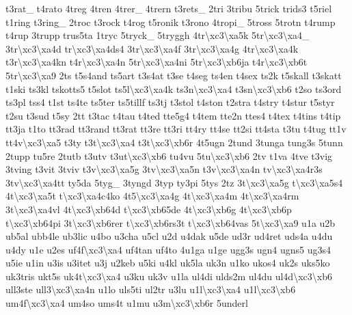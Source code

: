 \begin{DoxyCompactItemize}
t3rat\-\_\- t4rato 4treg 4tren 4trer\-\_\- 4trern t3rets\-\_\- 2tri 3tribu 5trick trids3 t5riel t1ring t3ring\-\_\- 2troc t3rock t4rog t5ronik t3rono 4tropi\-\_\- 5tross 5trotn t4rump t4rup 3trupp trus5ta 1tryc 5tryck\-\_\- 5tryggh 4tr\textbackslash{}xc3\textbackslash{}xa5k 5tr\textbackslash{}xc3\textbackslash{}xa4\-\_\- 3tr\textbackslash{}xc3\textbackslash{}xa4d tr\textbackslash{}xc3\textbackslash{}xa4ds4 3tr\textbackslash{}xc3\textbackslash{}xa4f 3tr\textbackslash{}xc3\textbackslash{}xa4g 4tr\textbackslash{}xc3\textbackslash{}xa4k t3r\textbackslash{}xc3\textbackslash{}xa4kn t4r\textbackslash{}xc3\textbackslash{}xa4n 5tr\textbackslash{}xc3\textbackslash{}xa4ni 5tr\textbackslash{}xc3\textbackslash{}xb6ja t4r\textbackslash{}xc3\textbackslash{}xb6t 5tr\textbackslash{}xc3\textbackslash{}xa9 2ts t5s4and ts5art t3s4at t3se t4seg ts4en t4sex ts2k t5skall t3skatt t1ski ts3kl tskotts5 t5slot ts5l\textbackslash{}xc3\textbackslash{}xa4k ts3n\textbackslash{}xc3\textbackslash{}xa4 t3sn\textbackslash{}xc3\textbackslash{}xb6 t2so ts3ord ts3pl tss4 t1st ts4te ts5ter ts5tillf ts3tj t3stol t4ston t2stra t4stry t4stur t5styr t2su t3sud t5sy 2tt t3tac t4tau t4ted tte5g4 t4tem tte2n ttes4 t4tex t4tins t4tip tt3ja t1to tt3rad tt3rand tt3rat tt3re tt3ri tt4ry tt4se tt2si tt4sta t3tu t4tug tt1v tt4v\textbackslash{}xc3\textbackslash{}xa5 t3ty t3t\textbackslash{}xc3\textbackslash{}xa4 t3t\textbackslash{}xc3\textbackslash{}xb6r 4t5ugn 2tund 3tunga tung3s 5tunn 2tupp tu5re 2tutb t3utv t3ut\textbackslash{}xc3\textbackslash{}xb6 tu4vu 5tu\textbackslash{}xc3\textbackslash{}xb6 2tv t1va 4tve t3vig 3tving t3vit 3tviv t3v\textbackslash{}xc3\textbackslash{}xa5g 3tv\textbackslash{}xc3\textbackslash{}xa5n t3v\textbackslash{}xc3\textbackslash{}xa4n tv\textbackslash{}xc3\textbackslash{}xa4r3s 3tv\textbackslash{}xc3\textbackslash{}xa4tt ty5da 5tyg\-\_\- 3tyngd 3typ ty3pi 5tys 2tz 3t\textbackslash{}xc3\textbackslash{}xa5g t\textbackslash{}xc3\textbackslash{}xa5s4 4t\textbackslash{}xc3\textbackslash{}xa5t t\textbackslash{}xc3\textbackslash{}xa4c4ko 4t5\textbackslash{}xc3\textbackslash{}xa4g 4t\textbackslash{}xc3\textbackslash{}xa4m 4t\textbackslash{}xc3\textbackslash{}xa4rm 3t\textbackslash{}xc3\textbackslash{}xa4vl 4t\textbackslash{}xc3\textbackslash{}xb64d t\textbackslash{}xc3\textbackslash{}xb65de 4t\textbackslash{}xc3\textbackslash{}xb6g 4t\textbackslash{}xc3\textbackslash{}xb6p t\textbackslash{}xc3\textbackslash{}xb64pi 3t\textbackslash{}xc3\textbackslash{}xb6rer t\textbackslash{}xc3\textbackslash{}xb6rs3t t\textbackslash{}xc3\textbackslash{}xb64vas 5t\textbackslash{}xc3\textbackslash{}xa9 u1a u2b ub5al ubb4le ub3lic u4bo u3cha u5cl u2d u4dak u5de ud3r ud4ret uds4a u4du u4dy u1e u2es uf4f\textbackslash{}xc3\textbackslash{}xa4 uf4tan uf4to 4u1ga u1ge ugg3s ugn4 ugns5 ug3s4 u5ie u1in u3is u3itet u3j u2keb u5ki u4kl uk5la uk3n u1ko ukos4 uk2s uks5ko uk3tris ukt5s uk4t\textbackslash{}xc3\textbackslash{}xa4 u3ku uk3v u1la ul4di ulds2m ul4du ul4d\textbackslash{}xc3\textbackslash{}xb6 ull3ste ull3\textbackslash{}xc3\textbackslash{}xa4n u1lo uls5ti ul2tr u3lu u1l\textbackslash{}xc3\textbackslash{}xa4 u1l\textbackslash{}xc3\textbackslash{}xb6 um4f\textbackslash{}xc3\textbackslash{}xa4 um4so ums4t u1mu u3m\textbackslash{}xc3\textbackslash{}xb6r 5underl 
\end{DoxyCompactItemize}
